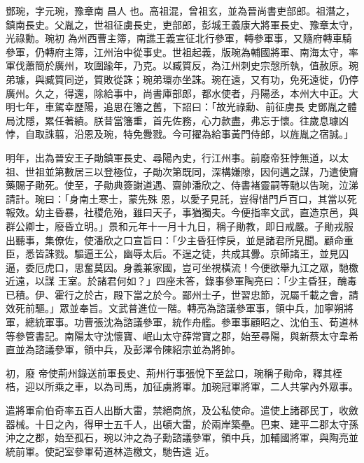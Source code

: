 
\begin{pinyinscope}

 鄧琬，字元琬，豫章南
 昌人
 也。高祖混，曾祖玄，並為晉尚書吏部郎。祖潛之，鎮南長史。父胤之，世祖征虜長史，吏部郎，彭城王義康大將軍長史、豫章太守，光祿勳。琬初
 為州西曹主簿，南譙王義宣征北行參軍，轉參軍事，又隨府轉車騎參軍，仍轉府主簿，江州治中從事史。世祖起義，版琬為輔國將軍、南海太守，率軍伐蕭簡於廣州，攻圍踰年，乃克。以臧質反，為江州刺史宗愨所執，值赦原。琬弟璩，與臧質同逆，質敗從誅；琬弟環亦坐誅。琬在遠，又有功，免死遠徙，仍停廣州。久之，得還，除給事中，尚書庫部郎，都水使者，丹陽丞，本州大中正。大明七年，車駕幸歷陽，追思在籓之舊，下詔曰：「故光祿勳、前征虜長
 史鄧胤之體局沈隱，累任著績。朕昔當籓重，首先佐務，心力款盡，弗忘于懷。往歲息璩凶悖，自取誅翦，沿恩及琬，特免釁戮。今可擢為給事黃門侍郎，以旌胤之宿誠。」



 明年，出為晉安王子勛鎮軍長史、尋陽內史，行江州事。前廢帝狂悖無道，以太祖、世祖並第數居三以登極位，子勛次第既同，深構嫌隙，因何邁之謀，乃遣使齎藥賜子勛死。使至，子勛典簽謝道遇、齋帥潘欣之、侍書褚靈嗣等馳以告琬，泣涕請計。琬曰：「身南土寒士，蒙先殊
 恩，以愛子見託，豈得惜門戶百口，其當以死報效。幼主昏暴，社稷危殆，雖曰天子，事猶獨夫。今便指率文武，直造京邑，與群公卿士，廢昏立明。」景和元年十一月十九日，稱子勛教，即日戒嚴。子勛戎服出聽事，集僚佐，使潘欣之口宣旨曰：「少主昏狂悖戾，並是諸君所見聞。顧命重臣，悉皆誅戮。驅逼王公，幽辱太后。不逞之徒，共成其釁。京師諸王，並見囚逼，委厄虎口，思奮莫因。身義兼家國，豈可坐視橫流！今便欲舉九江之眾，馳檄近遠，以謀
 王室。於諸君何如？」四座未答，錄事參軍陶亮曰：「少主昏狂，醜毒已積。伊、霍行之於古，殿下當之於今。鄙州士子，世習忠節，況屬千載之會，請效死前驅。」眾並奉旨。文武普進位一階。轉亮為諮議參軍事，領中兵，加寧朔將軍，總統軍事。功曹張沈為諮議參軍，統作舟艦。參軍事顧昭之、沈伯玉、荀道林等參管書記。南陽太守沈懷寶、岷山太守薛常寶之郡，始至尋陽，與新蔡太守韋希直並為諮議參軍，領中兵，及彭澤令陳紹宗並為將帥。



 初，廢
 帝使荊州錄送前軍長史、荊州行事張悅下至盆口，琬稱子勛命，釋其桎梏，迎以所乘之車，以為司馬，加征虜將軍。加琬冠軍將軍，二人共掌內外眾事。



 遣將軍俞伯奇率五百人出斷大雷，禁絕商旅，及公私使命。遣使上諸郡民丁，收斂器械。十日之內，得甲士五千人，出頓大雷，於兩岸築壘。巴東、建平二郡太守孫沖之之郡，始至孤石，琬以沖之為子勳諮議參軍，領中兵，加輔國將軍，與陶亮並統前軍。使記室參軍荀道林造檄文，馳告遠
 近。




\end{pinyinscope}
